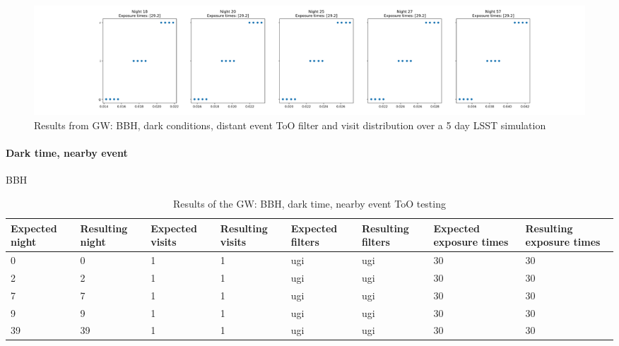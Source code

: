 \begin{figure}[h!]
    \centering
    \includegraphics[width=\linewidth]{figures/validationTests/SVRequired/BBHDarkFarFilterPlot.png}
    \caption{Results from GW: BBH, dark conditions, distant event ToO filter and visit distribution over a 5 day LSST simulation}
    \label{fig:GWBBHDarkFarFilterResult}
\end{figure}

\clearpage

\paragraph{Dark time, nearby event}

BBH

\begin{table}[h!]
\centering
\begin{adjustbox}{max width=\textwidth}
\begin{tabular}{|l|l|l|l|l|l|l|l|}
\hline
Expected night & Resulting night & Expected visits & Resulting visits & Expected filters & Resulting filters & Expected exposure times & Resulting exposure times \\ \hline
0              & 0               & 1               & 1                & ugi              & ugi               & 30                      & 30                       \\ \hline
2              & 2               & 1               & 1                & ugi              & ugi               & 30                      & 30                       \\ \hline
7              & 7               & 1               & 1                & ugi              & ugi               & 30                      & 30                       \\ \hline
9              & 9               & 1               & 1                & ugi              & ugi               & 30                      & 30                       \\ \hline
39             & 39              & 1               & 1                & ugi              & ugi               & 30                      & 30                       \\ \hline
\end{tabular}
\end{adjustbox}
\caption{Results of the GW: BBH, dark time, nearby event ToO testing}
\label{tab:GWBBHDarkNearResults}
\end{table}

